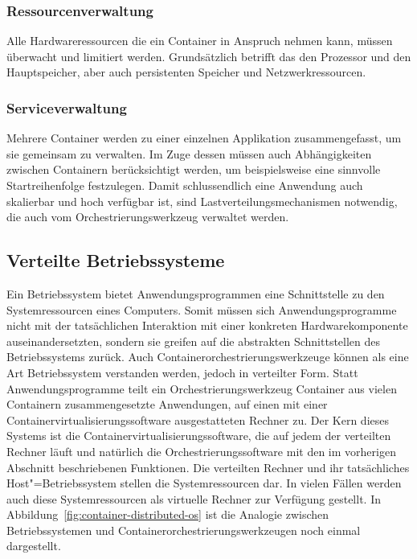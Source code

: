 \subsubsection{Ressourcenverwaltung}

Alle Hardwareressourcen die ein Container in Anspruch nehmen kann, müssen überwacht und limitiert werden. Grundsätzlich betrifft das den Prozessor und den Hauptspeicher, aber auch persistenten Speicher und Netzwerkressourcen.

\subsubsection{Serviceverwaltung}

Mehrere Container werden zu einer einzelnen Applikation zusammengefasst, um sie gemeinsam zu verwalten. Im Zuge dessen müssen auch Abhängigkeiten zwischen Containern berücksichtigt werden, um beispielsweise eine sinnvolle Startreihenfolge festzulegen. Damit schlussendlich eine Anwendung auch skalierbar und hoch verfügbar ist, sind Lastverteilungsmechanismen notwendig, die auch vom Orchestrierungswerkzeug verwaltet werden.

\subsection{Verteilte Betriebssysteme}

Ein Betriebssystem bietet Anwendungsprogrammen eine Schnittstelle zu den Systemressourcen eines Computers. Somit müssen sich Anwendungsprogramme nicht mit der tatsächlichen Interaktion mit einer konkreten Hardwarekomponente auseinandersetzten, sondern sie greifen auf die abstrakten Schnittstellen des Betriebssystems zurück. Auch Containerorchestrierungswerkzeuge können als eine Art Betriebssystem verstanden werden, jedoch in verteilter Form. Statt Anwendungsprogramme teilt ein Orchestrierungswerkzeug Container \bzw aus vielen Containern zusammengesetzte Anwendungen, auf einen mit einer Containervirtualisierungssoftware ausgestatteten Rechner zu. Der Kern dieses Systems ist die Containervirtualisierungssoftware, die auf jedem der verteilten Rechner läuft und natürlich die Orchestrierungssoftware mit den im vorherigen Abschnitt beschriebenen Funktionen. Die verteilten Rechner und ihr tatsächliches Host"=Betriebssystem stellen die Systemressourcen dar. In vielen Fällen werden auch diese Systemressourcen als virtuelle Rechner zur Verfügung gestellt. In Abbildung~\ref{fig:container-distributed-os} ist die Analogie zwischen Betriebssystemen und Containerorchestrierungswerkzeugen noch einmal dargestellt.

